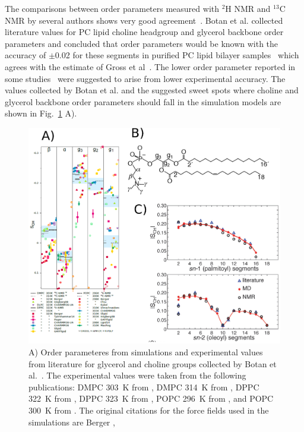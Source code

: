 \documentclass[aps,prl,superscriptaddress,twocolumn]{revtex4}
\begin{document}
The comparisons between order parameters measured with $^2$H NMR and $^{13}$C NMR by several authors
shows very good agreement~\cite{gross97,dvinskikh05a,ferreira13, botan15}.
Botan et al. collected literature values for PC lipid choline headgroup and glycerol backbone order parameters 
and concluded that order parameters would be known with the accuracy of $\pm$0.02 for these segments in purified PC lipid bilayer samples~\cite{botan15}
which agrees with the estimate of Gross et al~\cite{gross97}. 
The lower order parameter reported in some studies~\cite{hong95a,hong95b,warschawski05} were suggested to arise from lower experimental accuracy.
The values collected by Botan et al. and the suggested sweet spots where choline and glycerol backbone order parameters should fall in the 
simulation models are shown in Fig.~\ref{allOPs} A).
\begin{figure}[]
  \includegraphics[width=17.2cm]{../Fig/allOPs.eps}
  \caption{\label{allOPs}
    A)  Order parameteres from simulations and experimental values from literature for glycerol and choline groups collected by Botan et al.~\cite{botan15}.
    The experimental values were taken from the following publications:
    DMPC 303~K from \cite{gross97},
    DMPC 314~K from \cite{dvinskikh05a},
    DPPC 322~K from \cite{gally75},
    DPPC 323~K from \cite{akutsu81},
    POPC 296~K from \cite{bechinger91}, and
    POPC 300~K from \cite{ferreira13}.
    The original citations for the force fields used in the simulations are
    Berger \cite{berger97},
}
\end{figure}
\end{document}
